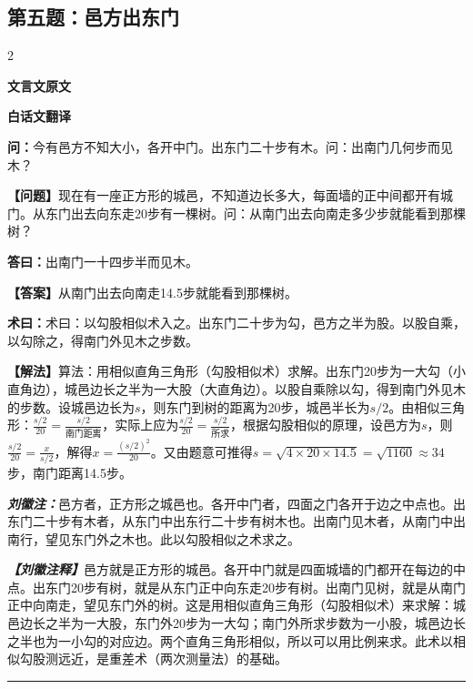\documentclass[10pt,a4paper]{article}
\newcommand{\wen}[1]{\textbf{\color{problemcolor}问：}#1\par}
\newcommand{\da}[1]{\textbf{答曰：}#1\par}
\newcommand{\shu}[1]{\textbf{术曰：}#1\par}
\newcommand{\liuhui}[1]{{\color{commentarycolor}\textit{\textbf{刘徽注：}}#1\par}}
\newcommand{\classicalheader}[1]{{\centering\large\bfseries\color{classicalcolor} #1\par\vspace{0.5em}}}
\newcommand{\wenmodern}[1]{\textbf{\color{moderncolor}【问题】}#1\par}
\newcommand{\damodern}[1]{\textbf{【答案】}#1\par}
\newcommand{\shumodern}[1]{\textbf{【解法】}#1\par}
\newcommand{\liuhuimodern}[1]{{\color{commentarycolor}\textit{\textbf{【刘徽注释】}}#1\par}}
\newcommand{\modernheader}[1]{{\centering\large\bfseries\color{moderncolor} #1\par\vspace{0.5em}}}
\newcommand{\problemsec}[1]{\subsection*{#1}}
\begin{document}
\problemsec{第五题：邑方出东门}
\begin{paracol}{2}
\classicalheader{文言文原文}
\switchcolumn
\modernheader{白话文翻译}
\switchcolumn*

\wen{今有邑方不知大小，各开中门。出东门二十步有木。问：出南门几何步而见木？}

\switchcolumn

\wenmodern{现在有一座正方形的城邑，不知道边长多大，每面墙的正中间都开有城门。从东门出去向东走20步有一棵树。问：从南门出去向南走多少步就能看到那棵树？}

\switchcolumn*

\da{出南门一十四步半而见木。}

\switchcolumn

\damodern{从南门出去向南走14.5步就能看到那棵树。}

\switchcolumn*

\shu{术曰：以勾股相似术入之。出东门二十步为勾，邑方之半为股。以股自乘，以勾除之，得南门外见木之步数。}

\switchcolumn

\shumodern{算法：用相似直角三角形（勾股相似术）求解。出东门20步为一大勾（小直角边），城邑边长之半为一大股（大直角边）。以股自乘除以勾，得到南门外见木的步数。设城邑边长为$s$，则东门到树的距离为20步，城邑半长为$s/2$。由相似三角形：$\frac{s/2}{20}=\frac{s/2}{\text{南门距离}}$，实际上应为$\frac{s/2}{20}=\frac{s/2}{\text{所求}}$，根据勾股相似的原理，设邑方为$s$，则$\frac{s/2}{20}=\frac{x}{s/2}$，解得$x=\frac{(s/2)^2}{20}$。又由题意可推得$s=\sqrt{4\times20\times14.5}=\sqrt{1160}\approx34$步，南门距离14.5步。}

\switchcolumn*

\liuhui{邑方者，正方形之城邑也。各开中门者，四面之门各开于边之中点也。出东门二十步有木者，从东门中出东行二十步有树木也。出南门见木者，从南门中出南行，望见东门外之木也。此以勾股相似之术求之。}

\switchcolumn

\liuhuimodern{邑方就是正方形的城邑。各开中门就是四面城墙的门都开在每边的中点。出东门20步有树，就是从东门正中向东走20步有树。出南门见树，就是从南门正中向南走，望见东门外的树。这是用相似直角三角形（勾股相似术）来求解：城邑边长之半为一大股，东门外20步为一大勾；南门外所求步数为一小股，城邑边长之半也为一小勾的对应边。两个直角三角形相似，所以可以用比例来求。此术以相似勾股测远近，是重差术（两次测量法）的基础。}

\end{paracol}

\vspace{0.3cm}
\hrule
\vspace{0.3cm}
\end{document}
